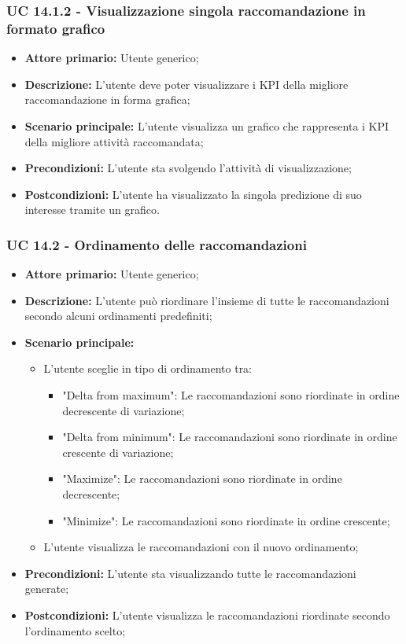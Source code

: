 \subsubsection{UC 14.1.2 - Visualizzazione singola raccomandazione in formato grafico}
\begin{itemize}
	\item \textbf{Attore primario:} Utente generico;
	\item \textbf{Descrizione:} L'utente deve poter visualizzare i KPI della migliore raccomandazione in forma grafica;
	\item \textbf{Scenario principale:} L'utente visualizza un grafico che rappresenta i KPI della migliore attività raccomandata;
	\item \textbf{Precondizioni:} L'utente sta svolgendo l'attività di visualizzazione;
	\item \textbf{Postcondizioni:} L'utente ha visualizzato la singola predizione di suo interesse tramite un grafico.
\end{itemize}


\subsubsection{UC 14.2 - Ordinamento delle raccomandazioni}
\begin{itemize}
	\item \textbf{Attore primario:} Utente generico;
	\item \textbf{Descrizione:} L'utente può riordinare l'insieme di tutte le raccomandazioni secondo alcuni ordinamenti predefiniti;
	\item \textbf{Scenario principale:} 
	\begin{itemize}
		\item L'utente sceglie in tipo di ordinamento tra:
			\begin{itemize}
				\item "Delta from maximum": Le raccomandazioni sono riordinate in ordine decrescente di variazione;
				\item "Delta from minimum": Le raccomandazioni sono riordinate in ordine crescente di variazione;
				\item "Maximize": Le raccomandazioni sono riordinate in ordine decrescente; 
				\item "Minimize": Le raccomandazioni sono riordinate in ordine crescente;
			\end{itemize}
		\item L'utente visualizza le raccomandazioni con il nuovo ordinamento;
	\end{itemize}
	\item \textbf{Precondizioni:} L'utente sta visualizzando tutte le raccomandazioni generate;
	\item \textbf{Postcondizioni:} L'utente visualizza le raccomandazioni riordinate secondo l'ordinamento scelto;
\end{itemize}


